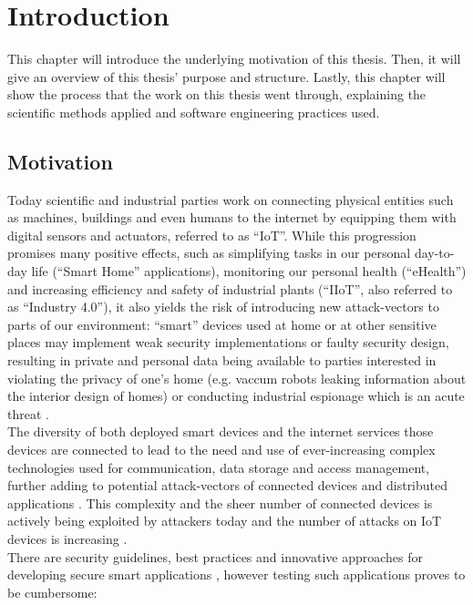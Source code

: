 \chapter{Introduction}
\label{chap:introduction}
This chapter will introduce the underlying motivation of this thesis. Then, it will give an overview of this thesis' purpose and structure. Lastly, this chapter will show the process that the work on this thesis went through, explaining the scientific methods applied and software engineering practices used.

\section{Motivation}
Today scientific and industrial parties work on connecting physical entities such as machines, buildings and even humans to the internet by equipping them with digital sensors and actuators, referred to as \enquote{\ac{IoT}}. While this progression promises many positive effects, such as simplifying tasks in our personal day-to-day life (\enquote{Smart Home} applications), monitoring our personal health (\enquote{eHealth}) %
and increasing efficiency and safety of industrial plants (\enquote{\ac{IIoT}}, also referred to as \enquote{Industry 4.0}), it also yields the risk of introducing new attack-vectors to parts of our environment: \enquote{smart} devices used at home or at other sensitive places may implement weak security implementations or faulty security design, resulting in private and personal data being available to parties interested in violating the privacy of one's home (e.g. vaccum robots leaking information about the interior design of homes\cite{wittenhorst_2019}) or conducting industrial espionage which is an acute threat \cite[p.~14]{bartsch2018}.\\
The diversity of both deployed smart devices and the internet services those devices are connected to lead to the need and use of ever-increasing complex technologies used for communication, data storage and access management, further adding to potential attack-vectors of connected devices and distributed applications \cite[p.~119]{Jaeger2016}.
This complexity and the sheer number of connected devices is actively being exploited by attackers today and the number of attacks on \ac{IoT} devices is increasing \cite{demeter_preuss_shmelev_2019}.\\
There are security guidelines, best practices and innovative approaches for developing secure smart applications \cite[p.~120]{Jaeger2016}\cite[p.326-328]{Lesjak2016}, however testing such applications proves to be cumbersome: %
